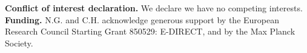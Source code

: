 \documentclass[11pt]{article}
\theoremstyle{plainCl1}
\theoremstyle{plainCl2}
\begin{document}
\noindent
{\bf Conflict of interest declaration.}
We declare we have no competing interests.\\

\noindent
{\bf Funding.}
N.G. and C.H. acknowledge generous support by the European Research Council Starting Grant 850529:
E-DIRECT, and by the Max Planck Society.\\




{
{\setlength{\bibsep}{0\baselineskip}


}




\clearpage
\newpage

}
\end{document}
